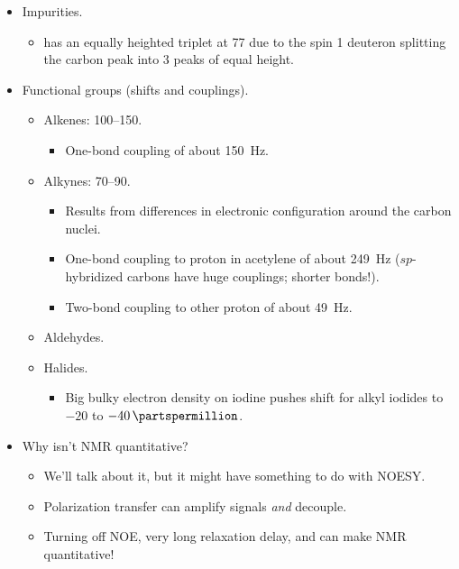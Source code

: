 \documentclass[../notes.tex]{subfiles}
\begin{document}
\begin{itemize}
\begin{itemize}
\begin{itemize}
        \end{itemize}
        \item Impurities.
        \begin{itemize}
            \item {} has an equally heighted triplet at \SI{77}{\partspermillion} due to the spin 1 deuteron splitting the carbon peak into 3 peaks of equal height.
        \end{itemize}
        \item Functional groups (shifts and couplings).
        \begin{itemize}
            \item Alkenes: \SIrange{100}{150}{\partspermillion}.
            \begin{itemize}
                \item One-bond coupling of about \SI{150}{\hertz}.
            \end{itemize}
            \item Alkynes: \SIrange{70}{90}{\partspermillion}.
            \begin{itemize}
                \item Results from differences in electronic configuration around the carbon nuclei.
                \item One-bond coupling to proton in acetylene of about \SI{249}{\hertz} ($sp$-hybridized carbons have huge couplings; shorter bonds!).
                \item Two-bond coupling to other proton of about \SI{49}{\hertz}.
            \end{itemize}
            \item Aldehydes.
            \item Halides.
            \begin{itemize}
                \item Big bulky electron density on iodine pushes shift for alkyl iodides to $-20$ to $-\SI{40}{\partspermillion}$.
            \end{itemize}
        \end{itemize}
        \item Why isn't  NMR quantitative?
        \begin{itemize}
            \item We'll talk about it, but it might have something to do with NOESY.
            \item Polarization transfer can amplify signals \emph{and} decouple.
            \item Turning off NOE, very long relaxation delay, and can make  NMR quantitative!

\end{itemize}
\end{itemize}
\end{itemize}
\end{document}
